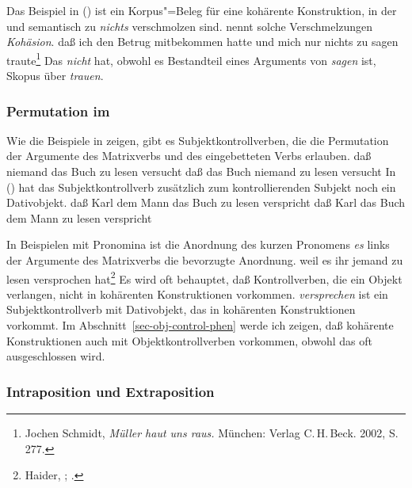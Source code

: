 Das Beispiel in () ist ein Korpus"=Beleg für eine kohärente Konstruktion, in der
 und  semantisch zu \emph{nichts} verschmolzen sind.
\citet[{\S}\,80]{Bech55a} nennt solche Verschmelzungen \emph{Kohäsion}.
\ea{}
\label{bsp-trauen-kohaerent}
daß ich den Betrug mitbekommen hatte und mich nur nichts zu sagen traute\footnote{
        Jochen Schmidt, \emph{Müller haut uns raus.} München: Verlag C.\,H.\,Beck. 2002, S.\,277.%
}
\z
Das \emph{nicht} hat, obwohl es Bestandteil eines Arguments von \emph{sagen} ist,
Skopus über \emph{trauen}.


\subsubsection{Permutation im \mf}
\label{sec-subj-contr-perm-mf}

Wie die Beispiele in  zeigen, gibt es Subjektkontrollverben, die die Permutation
der Argumente des Matrixverbs und des eingebetteten Verbs erlauben.
\eal
\ex daß niemand das Buch zu lesen versucht
\ex daß das Buch niemand zu lesen versucht
\zl
In () hat das Subjektkontrollverb zusätzlich zum kontrollierenden Subjekt noch ein Dativobjekt.
\eal{}
\ex daß Karl dem Mann das Buch zu lesen verspricht
\ex daß Karl das Buch dem Mann zu lesen verspricht
\zl

\noindent
In Beispielen mit Pronomina ist die Anordnung des kurzen Pronomens \emph{es}
links der Argumente des Matrixverbs die bevorzugte Anordnung.
\ea
\label{ex-weil-es-ihm-jemand-zu-lesen-versprochen-hat-zwei}
weil    es       ihr       jemand   zu lesen versprochen hat\footnote{
Haider, \citeyear[]{Haider86c}; \citeyear[]{Haider90b}.
}
\z
Es wird oft behauptet, daß Kontrollverben, die ein Objekt verlangen, nicht in kohärenten
Konstruktionen vorkommen.
\emph{versprechen} ist ein Subjektkontrollverb mit Dativobjekt, das
in kohärenten Konstruktionen vorkommt.
Im Abschnitt~\ref{sec-obj-control-phen} werde ich zeigen, daß kohärente Konstruktionen
auch mit Objektkontrollverben vorkommen, obwohl das oft ausgeschlossen wird.

\subsubsection{Intraposition und Extraposition}
\label{sec-subj-contr-ie}

